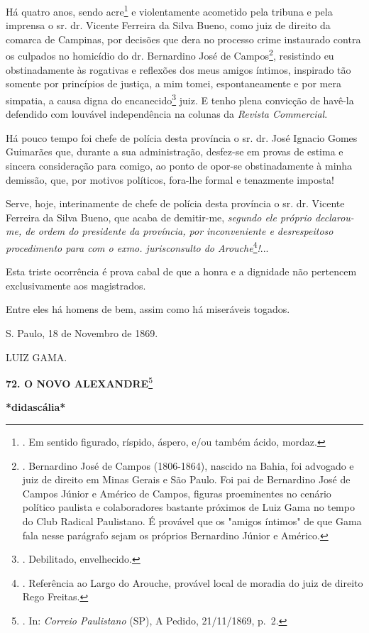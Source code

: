 Há quatro anos, sendo acre\footnote{. Em sentido figurado, ríspido,
  áspero, e/ou também ácido, mordaz.} e violentamente acometido pela
tribuna e pela imprensa o sr. dr. Vicente Ferreira da Silva Bueno, como
juiz de direito da comarca de Campinas, por decisões que dera no
processo crime instaurado contra os culpados no homicídio do dr.
Bernardino José de Campos\footnote{. Bernardino José de Campos
  (1806-1864), nascido na Bahia, foi advogado e juiz de direito em Minas
  Gerais e São Paulo. Foi pai de Bernardino José de Campos Júnior e
  Américo de Campos, figuras proeminentes no cenário político paulista e
  colaboradores bastante próximos de Luiz Gama no tempo do Club Radical
  Paulistano. É provável que os "amigos íntimos" de que Gama fala nesse
  parágrafo sejam os próprios Bernardino Júnior e Américo.}, resistindo
eu obstinadamente às rogativas e reflexões dos meus amigos íntimos,
inspirado tão somente por princípios de justiça, a mim tomei,
espontaneamente e por mera simpatia, a causa digna do
encanecido\footnote{. Debilitado, envelhecido.} juiz. E tenho plena
convicção de havê-la defendido com louvável independência na colunas da
\emph{Revista Commercial}.

Há pouco tempo foi chefe de polícia desta província o sr. dr. José
Ignacio Gomes Guimarães que, durante a sua administração, desfez-se em
provas de estima e sincera consideração para comigo, ao ponto de opor-se
obstinadamente à minha demissão, que, por motivos políticos, fora-lhe
formal e tenazmente imposta!

Serve, hoje, interinamente de chefe de polícia desta província o sr. dr.
Vicente Ferreira da Silva Bueno, que acaba de demitir-me, \emph{segundo
ele próprio declarou-me, de ordem do presidente da província, por
inconveniente e desrespeitoso procedimento para com o exmo.
jurisconsulto do Arouche}\footnote{. Referência ao Largo do Arouche,
  provável local de moradia do juiz de direito Rego Freitas.}\emph{!}...

Esta triste ocorrência é prova cabal de que a honra e a dignidade não
pertencem exclusivamente aos magistrados.

Entre eles há homens de bem, assim como há miseráveis togados.

S. Paulo, 18 de Novembro de 1869.

LUIZ GAMA.

\textbf{72. O NOVO ALEXANDRE}\footnote{. In: \emph{Correio Paulistano}
  (SP), A Pedido, 21/11/1869, p.~2.}

\textbf{*didascália*}

